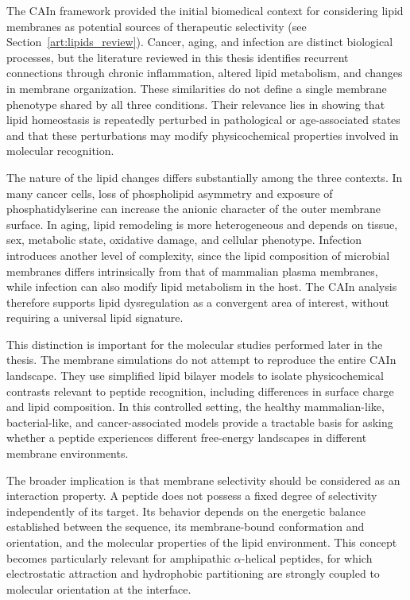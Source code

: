 The CAIn framework provided the initial biomedical context for considering lipid membranes as potential sources of therapeutic selectivity \cite{DANI_LIPIDOS} (see Section~\ref{art:lipids_review}). Cancer, aging, and infection are distinct biological processes, but the literature reviewed in this thesis identifies recurrent connections through chronic inflammation, altered lipid metabolism, and changes in membrane organization. These similarities do not define a single membrane phenotype shared by all three conditions. Their relevance lies in showing that lipid homeostasis is repeatedly perturbed in pathological or age-associated states and that these perturbations may modify physicochemical properties involved in molecular recognition.

The nature of the lipid changes differs substantially among the three contexts. In many cancer cells, loss of phospholipid asymmetry and exposure of phosphatidylserine can increase the anionic character of the outer membrane surface. In aging, lipid remodeling is more heterogeneous and depends on tissue, sex, metabolic state, oxidative damage, and cellular phenotype. Infection introduces another level of complexity, since the lipid composition of microbial membranes differs intrinsically from that of mammalian plasma membranes, while infection can also modify lipid metabolism in the host. The CAIn analysis therefore supports lipid dysregulation as a convergent area of interest, without requiring a universal lipid signature.

This distinction is important for the molecular studies performed later in the thesis. The membrane simulations do not attempt to reproduce the entire CAIn landscape. They use simplified lipid bilayer models to isolate physicochemical contrasts relevant to peptide recognition, including differences in surface charge and lipid composition. In this controlled setting, the healthy mammalian-like, bacterial-like, and cancer-associated models provide a tractable basis for asking whether a peptide experiences different free-energy landscapes in different membrane environments.

The broader implication is that membrane selectivity should be considered as an interaction property. A peptide does not possess a fixed degree of selectivity independently of its target. Its behavior depends on the energetic balance established between the sequence, its membrane-bound conformation and orientation, and the molecular properties of the lipid environment. This concept becomes particularly relevant for amphipathic $\alpha$-helical peptides, for which electrostatic attraction and hydrophobic partitioning are strongly coupled to molecular orientation at the interface.



